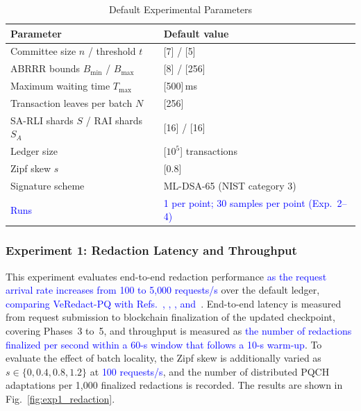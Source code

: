 \documentclass[lettersize,journal]{IEEEtran}
\newcommand{\chg}[1]{\textcolor{blue}{#1}}
\begin{document}
    \begin{table}[t]
    \centering
    \caption{Default Experimental Parameters}
    \label{tab:params}
    \scriptsize
    \renewcommand{\arraystretch}{1.08}
    \setlength{\tabcolsep}{4pt}
    \begin{tabular}{ll}
    \hline
    \textbf{Parameter} & \textbf{Default value} \\
    \hline
    Committee size $n$ / threshold $t$ & [7] / [5] \\
    ABRRR bounds $B_{\min}$ / $B_{\max}$ & [8] / [256] \\
    Maximum waiting time $T_{\max}$ & [500]\,ms \\
    Transaction leaves per batch $N$ & [256] \\
    SA-RLI shards $S$ / RAI shards $S_A$ & [16] / [16] \\
    Ledger size & [$10^5$] transactions \\
    Zipf skew $s$ & [0.8] \\
    Signature scheme & ML-DSA-65 (NIST category 3) \\
    \chg{Runs} & \chg{1 per point; 30 samples per point (Exp.~2--4)} \\
    \hline
    \end{tabular}
    \end{table}

    \subsubsection*{\textbf{Experiment 1: Redaction Latency and Throughput}}

    This experiment evaluates end-to-end redaction performance \chg{as the
    request arrival rate increases from 100 to 5{,}000 requests/s} over the
    default ledger, \chg{comparing VeRedact-PQ with Refs.~\cite{ref1},
    \cite{ref13}, \cite{ref27}, and~\cite{ref34}}. End-to-end latency is
    measured from request submission to blockchain finalization of the
    updated checkpoint, covering Phases~3 to~5, and throughput is measured as
    \chg{the number of redactions finalized per second within a 60-s window
    that follows a 10-s warm-up}. To evaluate the effect of batch locality,
    the Zipf skew is additionally varied as $s\in\{0,0.4,0.8,1.2\}$ at
    \chg{100 requests/s}, and the number of distributed PQCH adaptations per
    1,000 finalized redactions is recorded. The results are shown in
    Fig.~\ref{fig:exp1_redaction}.
\end{document}

